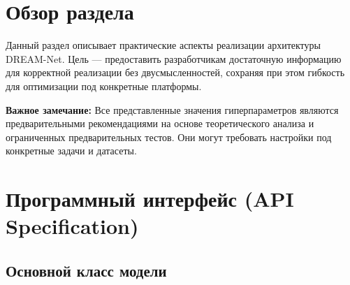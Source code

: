 \section{Обзор раздела}

Данный раздел описывает практические аспекты реализации архитектуры DREAM-Net. Цель — предоставить разработчикам достаточную информацию для корректной реализации без двусмысленностей, сохраняя при этом гибкость для оптимизации под конкретные платформы.

\textbf{Важное замечание:} Все представленные значения гиперпараметров являются предварительными рекомендациями на основе теоретического анализа и ограниченных предварительных тестов. Они могут требовать настройки под конкретные задачи и датасеты.

\section{Программный интерфейс (API Specification)}

\subsection{Основной класс модели}

